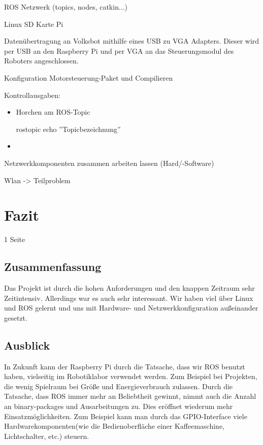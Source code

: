 \documentclass[12pt]{article}
\begin{document}
ROS Netzwerk (topics, nodes, catkin...)


Linux SD Karte Pi


Datenübertragung an Volksbot mithilfe eines USB zu VGA Adapters. Dieser wird per USB an den Raspberry Pi und per VGA an das Steuerungsmodul des Roboters angeschlossen.


Konfiguration Motorsteuerung-Paket und Compilieren


Kontrollausgaben:
\begin{itemize}

\item Horchen am ROS-Topic

\subitem rostopic echo ''Topicbezeichnung''

\item 

\end{itemize}

Netzwerkkomponenten zusammen arbeiten lassen (Hard/-Software)


Wlan -> Teilproblem




\section{Fazit}
1 Seite
\subsection{Zusammenfassung}

Das Projekt ist durch die hohen Anforderungen und den knappen Zeitraum sehr Zeitintensiv. Allerdings war es auch sehr interessant. Wir haben viel über Linux und ROS gelernt und uns mit Hardware- und Netzwerkkonfiguration außeinander gesetzt.


\subsection{Ausblick}

In Zukunft kann der Raspberry Pi durch die Tatsache, dass wir ROS benutzt haben, vielseitig im Robotiklabor verwendet werden. Zum Beispiel bei Projekten, die wenig Spielraum bei Größe und Energieverbrauch zulassen.
Durch die Tatsache, dass ROS immer mehr an Beliebtheit gewinnt, nimmt auch die Anzahl an binary-packages und Ausarbeitungen zu. Dies eröffnet wiederum mehr Einsatzmöglichkeiten.
Zum Beispiel kann man durch das GPIO-Interface viele Hardwarekomponenten(wie die Bedienoberfläche einer Kaffeemaschine, Lichtschalter, etc.) steuern.  
\end{document}

